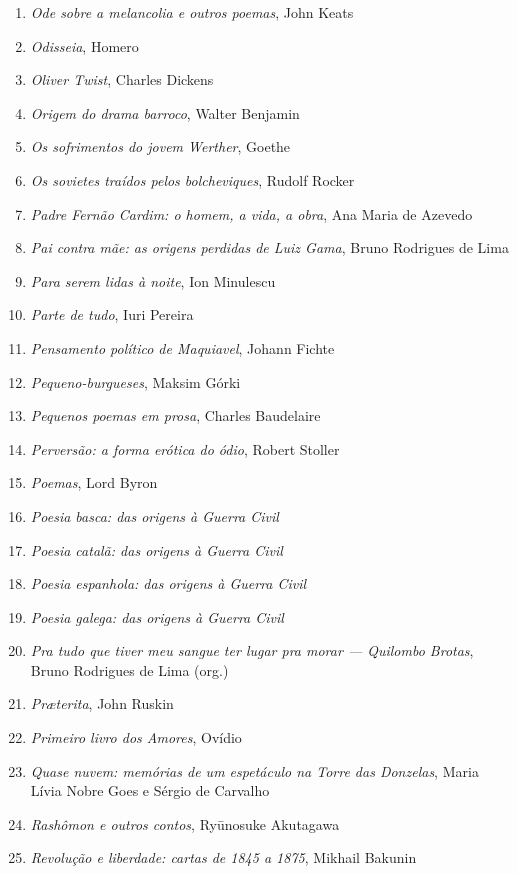 \begin{enumerate}
\item \textit{Ode sobre a melancolia e outros poemas}, John Keats
\item \textit{Odisseia}, Homero
\item \textit{Oliver Twist}, Charles Dickens
\item \textit{Origem do drama barroco}, Walter Benjamin
\item \textit{Os sofrimentos do jovem Werther}, Goethe
\item \textit{Os sovietes traídos pelos bolcheviques}, Rudolf Rocker
\item \textit{Padre Fernão Cardim: o homem, a vida, a obra}, Ana Maria de Azevedo
\item \textit{Pai contra mãe: as origens perdidas de Luiz Gama}, Bruno Rodrigues de Lima
\item \textit{Para serem lidas à noite}, Ion Minulescu
\item \textit{Parte de tudo}, Iuri Pereira
\item \textit{Pensamento político de Maquiavel}, Johann Fichte
\item \textit{Pequeno-burgueses}, Maksim Górki
\item \textit{Pequenos poemas em prosa}, Charles Baudelaire
\item \textit{Perversão: a forma erótica do ódio}, Robert Stoller
\item \textit{Poemas}, Lord Byron
\item \textit{Poesia basca: das origens à Guerra Civil} 
\item \textit{Poesia catalã: das origens à Guerra Civil} 
\item \textit{Poesia espanhola: das origens à Guerra Civil} 
\item \textit{Poesia galega: das origens à Guerra Civil} 
\item \textit{Pra tudo que tiver meu sangue ter lugar pra morar --- Quilombo Brotas},\\  Bruno Rodrigues de Lima (org.)
\item \textit{Pr\ae terita}, John Ruskin
\item \textit{Primeiro livro dos Amores}, Ovídio
\item \textit{Quase nuvem: memórias de um espetáculo na Torre das Donzelas}, Maria Lívia Nobre Goes e Sérgio de Carvalho
\item \textit{Rashômon e outros contos}, Ryūnosuke Akutagawa
\item \textit{Revolução e liberdade: cartas de 1845 a 1875}, Mikhail Bakunin

\end{enumerate}
